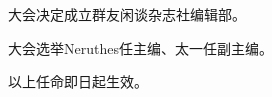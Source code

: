 



\rmfamily
\normalsize



大会决定成立群友闲谈杂志社编辑部。

大会选举Neruthes任主编、太一任副主编。

以上任命即日起生效。

\clearpage











